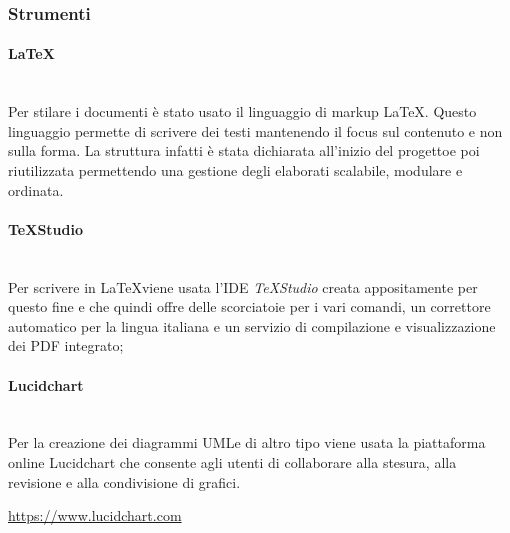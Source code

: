             \subsubsection{Strumenti}
                \paragraph{\LaTeX}\mbox{}\\ [1mm]
                    Per stilare i documenti è stato usato il linguaggio di markup \LaTeX. Questo linguaggio permette di scrivere dei testi mantenendo il focus
                    sul contenuto e non sulla forma. La struttura infatti è stata dichiarata all'inizio del progetto\glosp e poi riutilizzata permettendo una gestione degli elaborati scalabile, modulare e ordinata.
                \paragraph{TeXStudio}\mbox{}\\ [1mm]
                    Per scrivere in \LaTeX viene usata l'IDE \textit{TeXStudio} creata appositamente per questo fine e che quindi offre delle scorciatoie
                    per i vari comandi, un correttore automatico per la lingua italiana e un servizio di compilazione e visualizzazione dei PDF integrato;
                \paragraph{Lucidchart}\mbox{}\\ [1mm]
                    Per la creazione dei diagrammi UML\glosp e di altro tipo viene usata la piattaforma online Lucidchart che consente agli utenti di collaborare alla stesura, alla revisione e alla condivisione di grafici. \newline \newline
                    \centerline{\url{https://www.lucidchart.com}}